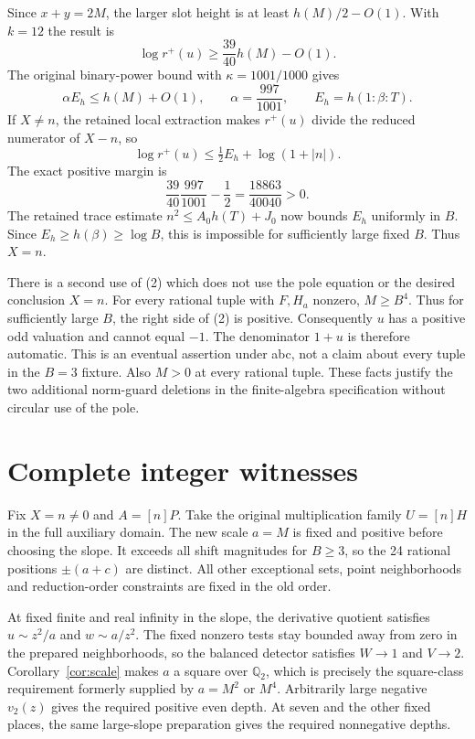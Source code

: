 \documentclass[11pt]{article}
\newcommand{\Q}{\mathbb Q}\newcommand{\Z}{\mathbb Z}
\begin{document}
Since $x+y=2M$, the larger slot height is at least
$h(M)/2-O(1)$. With $k=12$ the result is
\[
 \log r^+(u)\ge\frac{39}{40}h(M)-O(1).       \tag{2}
\]
The original binary-power bound with $\kappa=1001/1000$ gives
\[
 \alpha E_h\le h(M)+O(1),\qquad
 \alpha=\frac{997}{1001},\qquad E_h=h(1:\beta:T).
\]
If $X\ne n$, the retained local extraction makes $r^+(u)$ divide
the reduced numerator of $X-n$, so
\[
 \log r^+(u)\le\tfrac12E_h+\log(1+|n|).
\]
The exact positive margin is
\[
 \frac{39}{40}\frac{997}{1001}-\frac12=\frac{18863}{40040}>0.
\]
The retained trace estimate $n^2\le A_0h(T)+J_0$ now bounds
$E_h$ uniformly in $B$. Since $E_h\ge h(\beta)\ge\log B$,
this is impossible for sufficiently large fixed $B$. Thus $X=n$.

There is a second use of (2) which does not use the pole equation or
the desired conclusion $X=n$. For every rational tuple with $F,H_a$
nonzero, $M\ge B^4$. Thus for sufficiently large $B$, the right
side of (2) is positive. Consequently $u$ has a positive odd
valuation and cannot equal $-1$. The denominator $1+u$ is therefore
automatic. This is an eventual assertion under abc, not a claim about
every tuple in the $B=3$ fixture. Also $M>0$ at every rational tuple.
These facts justify the two additional norm-guard deletions in the
finite-algebra specification without circular use of the pole.

\section{Complete integer witnesses}

Fix $X=n\ne0$ and $A=[n]P$. Take the original multiplication family
$U=[n]H$ in the full auxiliary domain. The new scale $a=M$ is fixed
and positive before choosing the slope. It exceeds all shift
magnitudes for $B\ge3$, so the 24 rational positions $\pm(a+c)$
are distinct. All other exceptional sets, point neighborhoods and
reduction-order constraints are fixed in the old order.

At fixed finite and real infinity in the slope, the derivative quotient
satisfies $u\sim z^2/a$ and $w\sim a/z^2$. The fixed nonzero tests
stay bounded away from zero in the prepared neighborhoods, so the
balanced detector satisfies $W\to1$ and $V\to2$.
Corollary~\ref{cor:scale} makes $a$ a square over $\Q_2$, which is
precisely the square-class requirement formerly supplied by $a=M^2$
or $M^4$. Arbitrarily large negative $v_2(z)$ gives the required
positive even depth. At seven and the other fixed places, the same
large-slope preparation gives the required nonnegative depths.
\end{document}

